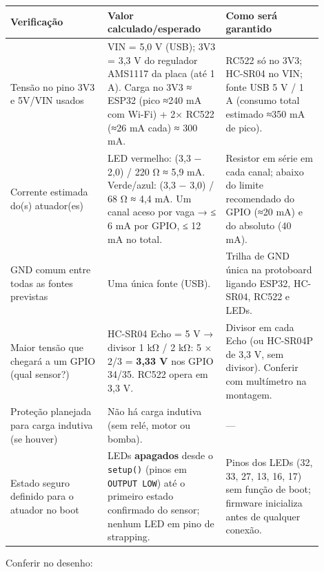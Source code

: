 \documentclass[11pt,a4paper]{article}
\newcommand{\cod}[1]{\texttt{#1}}
\begin{document}
\begin{longtable}{|p{0.28\linewidth}|p{0.34\linewidth}|p{0.28\linewidth}|}
\hline
\textbf{Verificação} & \textbf{Valor calculado/esperado} & \textbf{Como será garantido} \\ \hline \endhead
Tensão no pino 3V3 e 5V/VIN usados & VIN = 5,0 V (USB); 3V3 = 3,3 V do regulador AMS1117 da placa (até 1 A). Carga no 3V3 ≈ ESP32 (pico ≈240 mA com Wi-Fi) + 2× RC522 (≈26 mA cada) ≈ 300 mA. & RC522 só no 3V3; HC-SR04 no VIN; fonte USB 5 V / 1 A (consumo total estimado ≈350 mA de pico). \\ \hline
Corrente estimada do(s) atuador(es) & LED vermelho: (3,3 − 2,0) / 220 Ω ≈ 5,9 mA. Verde/azul: (3,3 − 3,0) / 68 Ω ≈ 4,4 mA. Um canal aceso por vaga → ≤ 6 mA por GPIO, ≤ 12 mA no total. & Resistor em série em cada canal; abaixo do limite recomendado do GPIO (≈20 mA) e do absoluto (40 mA). \\ \hline
GND comum entre todas as fontes previstas & Uma única fonte (USB). & Trilha de GND única na protoboard ligando ESP32, HC-SR04, RC522 e LEDs. \\ \hline
Maior tensão que chegará a um GPIO (qual sensor?) & HC-SR04 Echo = 5 V → divisor 1 kΩ / 2 kΩ: 5 × 2/3 = \textbf{3,33 V} nos GPIO 34/35. RC522 opera em 3,3 V. & Divisor em cada Echo (ou HC-SR04P de 3,3 V, sem divisor). Conferir com multímetro na montagem. \\ \hline
Proteção planejada para carga indutiva (se houver) & Não há carga indutiva (sem relé, motor ou bomba). & --- \\ \hline
Estado seguro definido para o atuador no boot & LEDs \textbf{apagados} desde o \cod{setup()} (pinos em \cod{OUTPUT LOW}) até o primeiro estado confirmado do sensor; nenhum LED em pino de strapping. & Pinos dos LEDs (32, 33, 27, 13, 16, 17) sem função de boot; firmware inicializa antes de qualquer conexão. \\ \hline
\end{longtable}

Conferir no desenho:
\end{document}
